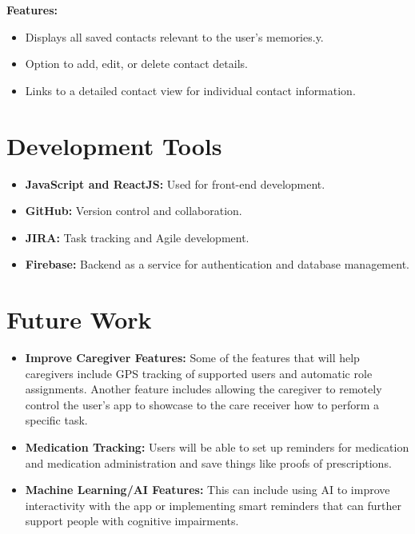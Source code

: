 \documentclass[12pt]{article}
\begin{document}
\textbf{Features:}
\begin{itemize}
     \item Displays all saved contacts relevant to the user’s memories.y.
    \item Option to add, edit, or delete contact details.
    \item Links to a detailed contact view for individual contact information.
\end{itemize}

\section{Development Tools}
\begin{itemize}
    \item \textbf{JavaScript and ReactJS:} Used for front-end development.
    \item \textbf{GitHub:} Version control and collaboration.
    \item \textbf{JIRA:} Task tracking and Agile development.
    \item \textbf{Firebase:} Backend as a service for authentication and database management.
\end{itemize}
\section{Future Work}
\begin{itemize}
    \item \textbf{Improve Caregiver Features:} Some of the features that will help caregivers include GPS tracking of supported users and automatic role assignments. Another feature includes allowing the caregiver to remotely control the user’s app to showcase to the care receiver how to perform a specific task.
    \item \textbf{Medication Tracking:} Users will be able to set up reminders for medication and medication administration and save things like proofs of prescriptions.
    \item \textbf{Machine Learning/AI Features:} This can include using AI to improve interactivity with the app or implementing smart reminders that can further support people with cognitive impairments.
\end{itemize}
\end{document}
